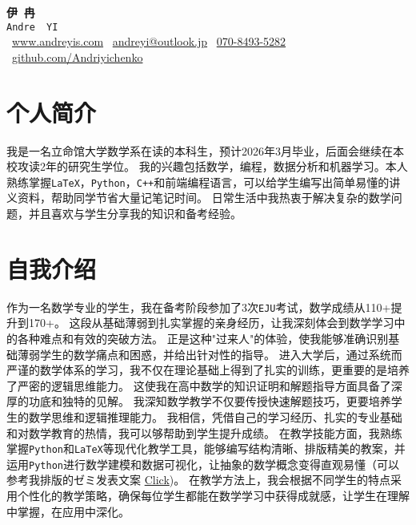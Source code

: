 \documentclass[11pt,a4paper]{article}
\begin{document}
\begin{center}
    {\Huge \textbf{伊\, 冉}}\\[8pt]
      {\large \texttt{Andre\, YI}}\\[4pt]
      \small
      \faHome\ \href{https://www.andreyis.com}{www.andreyis.com} \quad
      \faEnvelope\ \href{mailto:andreyi@outlook.jp}{andreyi@outlook.jp} \quad
    \faPhone\ \href{tel:070-8493-5282}{070-8493-5282} \quad
      \faGithub\ \href{https://github.com/Andriyichenko}{github.com/Andriyichenko} \quad
      
\end{center}

\vspace{-5pt}

\section*{个人简介}
我是一名立命馆大学数学系在读的本科生，预计2026年3月毕业，后面会继续在本校攻读2年的研究生学位。
我的兴趣包括数学，编程，数据分析和机器学习。本人熟练掌握\texttt{LaTeX}，\texttt{Python}，\texttt{C++}和前端编程语言，可以给学生编写出简单易懂的讲义资料，帮助同学节省大量记笔记时间。
日常生活中我热衷于解决复杂的数学问题，并且喜欢与学生分享我的知识和备考经验。


\section*{自我介绍}
作为一名数学专业的学生，我在备考阶段参加了3次\texttt{EJU}考试，数学成绩从110+提升到170+。
这段从基础薄弱到扎实掌握的亲身经历，让我深刻体会到数学学习中的各种难点和有效的突破方法。
正是这种"过来人"的体验，使我能够准确识别基础薄弱学生的数学痛点和困惑，并给出针对性的指导。
进入大学后，通过系统而严谨的数学体系的学习，我不仅在理论基础上得到了扎实的训练，更重要的是培养了严密的逻辑思维能力。
这使我在高中数学的知识证明和解题指导方面具备了深厚的功底和独特的见解。
我深知数学教学不仅要传授快速解题技巧，更要培养学生的数学思维和逻辑推理能力。
我相信，凭借自己的学习经历、扎实的专业基础和对数学教育的热情，我可以够帮助到学生提升成绩。
在教学技能方面，我熟练掌握\texttt{Python}和\texttt{LaTeX}等现代化教学工具，能够编写结构清晰、排版精美的教案，并运用\texttt{Python}进行数学建模和数据可视化，让抽象的数学概念变得直观易懂（可以参考我排版的ゼミ发表文案 \href{https://github.com/Andriyichenko/research/blob/main/semi/ML3.10/out/ML3.10.pdf}{Click})。
在教学方法上，我会根据不同学生的特点采用个性化的教学策略，确保每位学生都能在数学学习中获得成就感，让学生在理解中掌握，在应用中深化。
\end{document}
